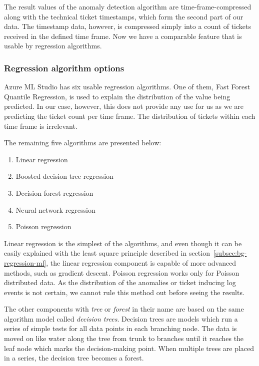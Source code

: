 The result values of the anomaly detection algorithm
are time-frame-compressed along with the technical ticket timestamps,
which form the second part of our data.
The timestamp data, however,
is compressed simply into a count of tickets received in the defined time frame.
Now we have a comparable feature
that is usable by regression algorithms.




\subsubsection*{Regression algorithm options}\label{subsec:pipe-regression-algorithm-options}

Azure ML Studio has six usable regression algorithms.
One of them,
Fast Forest Quantile Regression,
is used to explain the distribution of the value being predicted.\cite{azure2021fastforestquantile}
In our case, however,
this does not provide any use for us
as we are predicting the ticket count per time frame.
The distribution of tickets within each time frame is irrelevant.

The remaining five algorithms are presented below:
\begin{enumerate}
    \item Linear regression~\cite{azure2021linear}
    \item Boosted decision tree regression~\cite{azure2022boosteddecisiontree}
    \item Decision forest regression~\cite{azure2021decisionforest}
    \item Neural network regression~\cite{azure2021neuralnetwork}
    \item Poisson regression~\cite{azure2021poisson}
\end{enumerate}

Linear regression is the simplest of the algorithms,
and even though it can be easily explained with the least square principle
described in section~\ref{subsec:bg-regression-ml},
the linear regression component is capable of more advanced methods,
such as gradient descent.
Poisson regression works only for Poisson distributed data.
As the distribution of the anomalies or ticket inducing log events is not certain,
we cannot rule this method out before seeing the results.

The other components with \textit{tree} or \textit{forest} in their name
are based on the same algorithm model called \textit{decision trees}.
Decision trees are models
which run a series of simple tests
for all data points in each branching node.
The data is moved on like water along the tree from trunk to branches
until it reaches the leaf node which marks the decision-making point.
When multiple trees are placed in a series,
the decision tree becomes a forest.~\cite{azure2021decisionforest}

